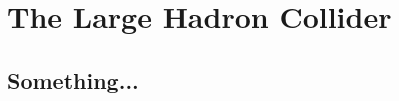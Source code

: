 \chapter{The Large Hadron Collider}

\minitoc\vspace{5ex}


\section{Something... }

\cite{Salam1964168}

